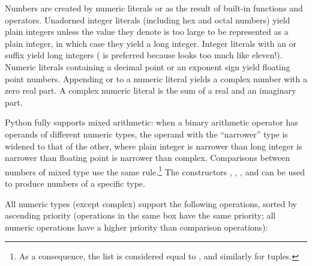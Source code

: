 Numbers are created by numeric literals or as the result of built-in
functions and operators.  Unadorned integer literals (including hex
and octal numbers) yield plain integers unless the value they denote
is too large to be represented as a plain integer, in which case
they yield a long integer.  Integer literals with an
 or  suffix yield long integers
( is preferred because  looks too much like
eleven!).  Numeric literals containing a decimal point or an exponent
sign yield floating point numbers.  Appending  or
 to a numeric literal yields a complex number with a
zero real part. A complex numeric literal is the sum of a real and
an imaginary part.

Python fully supports mixed arithmetic: when a binary arithmetic
operator has operands of different numeric types, the operand with the
``narrower'' type is widened to that of the other, where plain
integer is narrower than long integer is narrower than floating point is
narrower than complex.
Comparisons between numbers of mixed type use the same rule.\footnote{
	As a consequence, the list \code{[1, 2]} is considered equal
        to \code{[1.0, 2.0]}, and similarly for tuples.
} The constructors , , ,
and  can be used
to produce numbers of a specific type.

All numeric types (except complex) support the following operations,
sorted by ascending priority (operations in the same box have the same
priority; all numeric operations have a higher priority than
comparison operations):

